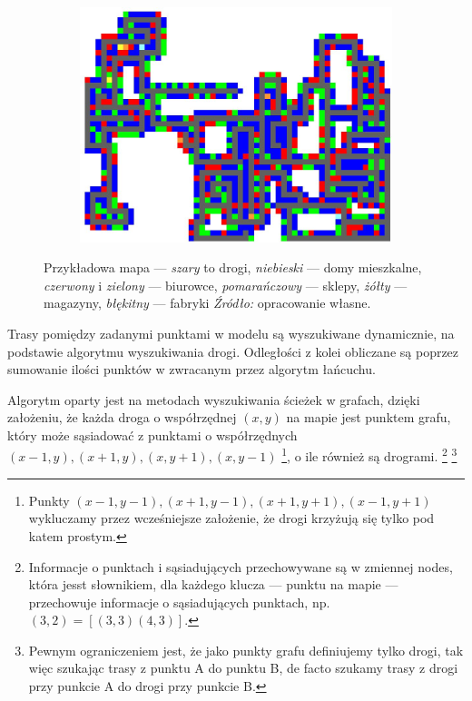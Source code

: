 \documentclass[polish, twoside, 12pt, a4paper]{article}
\theoremstyle{definition}
\theoremstyle{plain}
\theoremstyle{remark}
\begin{document}
\begin{figure}[hbt]
  \centering
  \begin{subfigure}[t]{0.45\textwidth}
    \includegraphics[width=\textwidth]{pictures/mapatypow.png}
  \end{subfigure}
  \captionsetup{margin=10pt,font=small,labelfont=bf,width=.8\textwidth}
  \caption[Przykładowa wygenerowana mapa]{Przykładowa mapa --- \textit{szary} to drogi, \textit{niebieski} --- domy mieszkalne, \textit{czerwony} i \textit{zielony} --- biurowce, \textit{pomarańczowy} --- sklepy, \textit{żółty} --- magazyny, \textit{błękitny} --- fabryki \textit{Źródło:} opracowanie własne.}\label{fig:mapa}
\end{figure}


Trasy pomiędzy zadanymi punktami w modelu są wyszukiwane dynamicznie, na podstawie algorytmu wyszukiwania drogi. Odległości z kolei obliczane są poprzez sumowanie ilości punktów w zwracanym przez algorytm łańcuchu. 

Algorytm oparty jest na metodach wyszukiwania ścieżek w grafach, dzięki założeniu, że każda droga o współrzędnej $(x,y)$ na mapie jest punktem grafu, który może sąsiadować z punktami o współrzędnych $(x-1,y),(x+1,y),(x,y+1),(x,y-1)$ \footnote{Punkty $(x-1,y-1),(x+1,y-1),(x+1,y+1),(x-1,y+1)$ wykluczamy przez wcześniejsze założenie, że drogi krzyżują się tylko pod katem prostym.}, o ile również są drogrami. \footnote{Informacje o punktach i sąsiadujących przechowywane są w zmiennej nodes, która jesst słownikiem, dla każdego klucza --- punktu na mapie --- przechowuje informacje o sąsiadujących punktach, np. $(3,2) = [(3,3)(4,3)]$.} \footnote{Pewnym ograniczeniem jest, że jako punkty grafu definiujemy tylko drogi, tak więc szukając trasy z punktu A do punktu B, de facto szukamy trasy z drogi przy punkcie A do drogi przy punkcie B.}
\end{document}
